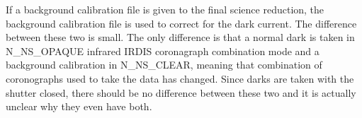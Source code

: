 \documentclass[twoside,single]{lion-msc}
\begin{document}
If a background calibration file is given to the final science reduction, the background calibration file is used to correct for the dark current. The difference between these two is small. The only difference is that a normal dark is taken in N\_NS\_OPAQUE infrared IRDIS coronagraph combination mode and a background calibration in N\_NS\_CLEAR, meaning that combination of coronographs used to take the data has changed. Since darks are taken with the shutter closed, there should be no difference between these two and it is actually unclear why they even have both. \cite{Mouillet2013}

\end{document}
